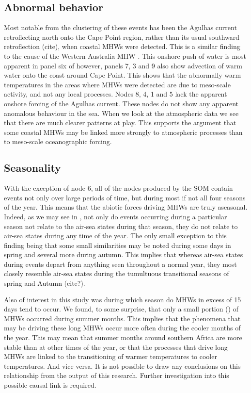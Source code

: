 \documentclass[a4paper,10pt,review]{elsarticle}
\begin{document}
\subsection{Abnormal behavior}
Most notable from the clustering of these events has been the Agulhas current retroflecting north onto the Cape Point region, rather than its usual southward retroflection (cite), when coastal MHWs were detected. This is a similar finding to the cause of the Western Australia MHW \citep{Feng2013, Benthuysen2014}. This onshore push of water is most apparent in panel six of  however, panels 7, 3 and 9 also show advection of warm water onto the coast around Cape Point. This shows that the abnormally warm temperatures in the areas where MHWs were detected are due to meso-scale activity, and not any local processes. Nodes 8, 4, 1 and 5 lack the apparent onshore forcing of the Agulhas current. These nodes do not show any apparent anomalous behaviour in the sea. When we look at the atmospheric data we see that there are much clearer patterns at play. This supports the argument that some coastal MHWs may be linked more strongly to atmospheric processes than to meso-scale oceanographic forcing.

\subsection{Seasonality}
With the exception of node 6, all of the nodes produced by the SOM contain events not only over large periods of time, but during most if not all four seasons of the year. This means  that the abiotic forces driving MHWs are truly aseasonal. Indeed, as we may see in , not only do events occurring during a particular season not relate to the air-sea states during that season, they do not relate to air-sea states during any time of the year. The only small exception to this finding being that some small similarities may be noted during some days in spring and several more during autumn. This implies that whereas air-sea states during events depart from anything seen throughout a normal year, they most closely resemble air-sea states during the tumultuous transitional seasons of spring and Autumn (cite?).

Also of interest in this study was during which season do MHWs in excess of 15 days tend to occur. We found, to some surprise, that only a small portion () of MHWs occurred during summer months. This implies that the phenomena that may be driving these long MHWs occur more often during the cooler months of the year. This may mean that summer months around southern Africa are more stable than at other times of the year, or that the processes that drive long MHWs are linked to the transitioning of warmer temperatures to cooler temperatures. And vice versa. It is not possible to draw any conclusions on this relationship from the output of this research. Further investigation into this possible causal link is required.
\end{document}
